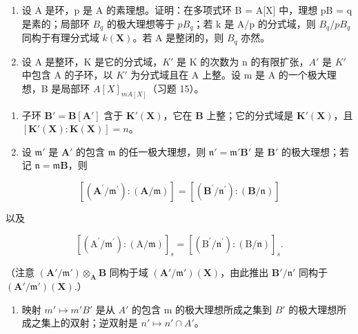 \begin{enumerate}
\def\labelenumi{\arabic{enumi}.}
\setcounter{enumi}{14}
\item
  设 A 是环，p 是 A 的素理想。证明：在多项式环 B = A{[}X{]} 中，理想 pB = q 是素的；局部环 \(B_{q}\) 的极大理想等于 \(pB_{q}\)；若 k 是 A/p 的分式域，则 \(B_{q}/pB_{q}\) 同构于有理分式域 \(k(\mathbf{X})\)。若 A 是整闭的，则 \(B_{q}\) 亦然。
\item
  设 A 是整环，K 是它的分式域，\(K'\) 是 K 的次数为 n 的有限扩张，\(A'\) 是 \(K'\) 中包含 A 的子环，以 \(K'\) 为分式域且在 A 上整。设 m 是 A 的一个极大理想，B 是局部环 \(A[X]_{mA[X]}\)（习题 15）。
\end{enumerate}

\begin{enumerate}
\def\labelenumi{(\alph{enumi})}
\item
  子环 \(\mathbf{B}' = \mathbf{B}[\mathbf{A}']\) 含于 \(\mathbf{K}'(\mathbf{X})\)，它在 \(\mathbf{B}\) 上整；它的分式域是 \(\mathbf{K}'(\mathbf{X})\)，且 \([\mathbf{K}'(\mathbf{X}) : \mathbf{K}(\mathbf{X})] = n\)。
\item
  设 \(\mathfrak{m}'\) 是 \(\mathbf{A}'\) 的包含 \(\mathfrak{m}\) 的任一极大理想，则 \(\mathfrak{n}' = \mathfrak{m}'\mathbf{B}'\) 是 \(\mathbf{B}'\) 的极大理想；若记 \(\mathfrak{n} = \mathfrak{m}\mathbf{B}\)，则
\end{enumerate}

\[
[ (\mathbf {A} ^ {\prime} / \mathfrak {m} ^ {\prime}): (\mathbf {A} / \mathfrak {m}) ] = [ (\mathbf {B} ^ {\prime} / \mathfrak {n} ^ {\prime}): (\mathbf {B} / \mathfrak {n}) ]
\]

以及

\[
[ (\mathrm{A} ^ {\prime} / \mathfrak {m} ^ {\prime}): (\mathrm{A} / \mathfrak {m}) ] _ {s} = [ (\mathrm{B} ^ {\prime} / \mathfrak {n} ^ {\prime}): (\mathrm{B} / \mathfrak {n}) ] _ {s}.
\]

（注意 \((\mathbf{A}' / \mathfrak{m}') \otimes_{\mathbf{A}} \mathbf{B}\) 同构于域 \((\mathbf{A}' / \mathfrak{m}')(\mathbf{X})\)，由此推出 \(\mathbf{B}' / \mathfrak{n}'\) 同构于 \((\mathbf{A}' / \mathfrak{m}')(\mathbf{X}).\)）

\begin{enumerate}
\def\labelenumi{(\alph{enumi})}
\setcounter{enumi}{2}
\tightlist
\item
  映射 \(m' \mapsto m'B'\) 是从 \(A'\) 的包含 m 的极大理想所成之集到 \(B'\) 的极大理想所成之集上的双射；逆双射是 \(n' \mapsto n' \cap A'\)。
\end{enumerate}

